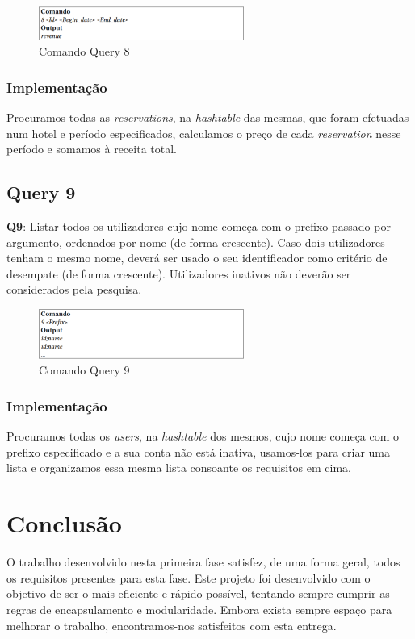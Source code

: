 \documentclass[11pt]{article}
\begin{document}
\begin{figure}[hbt!]
    \centering
    \includegraphics[width=0.6\textwidth]{comandq8.png}
    \caption{Comando Query 8}
    \label{fig:example}
\end{figure}

\subsubsection{Implementação}
Procuramos todas as \textit{reservations}, na \textit{hashtable} das mesmas, que foram efetuadas num hotel e período especificados, calculamos o preço de cada \textit{reservation} nesse período e somamos à receita total.


\newpage
\subsection{Query 9}


\textbf{Q9}: Listar todos os utilizadores cujo nome começa com o prefixo passado por argumento, ordenados
por nome (de forma crescente). Caso dois utilizadores tenham o mesmo nome, deverá ser usado
o seu identificador como critério de desempate (de forma crescente). Utilizadores inativos não
deverão ser considerados pela pesquisa.

\begin{figure}[hbt!]
    \centering
    \includegraphics[width=0.6\textwidth]{comandq9.png}
    \caption{Comando Query 9}
    \label{fig:example}
\end{figure}

\subsubsection{Implementação}
Procuramos todas os \textit{users}, na \textit{hashtable} dos mesmos, cujo nome começa com o prefixo especificado e a sua conta não está inativa, usamos-los para criar uma lista e organizamos essa mesma lista consoante os requisitos em cima.


\section{Conclusão}
O trabalho desenvolvido nesta primeira fase satisfez, de uma forma geral, todos os requisitos presentes para esta fase. Este projeto foi desenvolvido com o objetivo de ser o mais eficiente e rápido possível, tentando sempre cumprir as regras de encapsulamento e modularidade. Embora exista sempre espaço para melhorar o trabalho, encontramos-nos satisfeitos com esta entrega.
\end{document}
